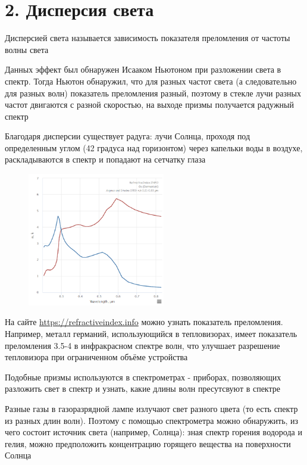 \section{2. Дисперсия света}

Дисперсией света называется зависимость показателя преломления от частоты волны света

Данных эффект был обнаружен Исааком Ньютоном при разложении света в спектр. Тогда Ньютон обнаружил, что для разных частот света (а следовательно для разных волн) показатель преломления разный, поэтому в стекле лучи разных частот двигаются с разной скоростью, на выходе призмы получается радужный спектр 

Благодаря дисперсии существует радуга: лучи Солнца, проходя под определенным углом (42 градуса над горизонтом) через капельки воды в воздухе, раскладываются в спектр и попадают на сетчатку глаза

\begin{figure}
    \includegraphics[width=6cm]{physics3/images/physics3_germanium_refractive_index}
\end{figure}

На сайте \url{https://refractiveindex.info} можно узнать показатель преломления. Например, металл германий, использующийся в тепловизорах, имеет показатель преломления 3.5-4 в инфракрасном спектре волн, что улучшает разрешение тепловизора при ограниченном объёме устройства

Подобные призмы используются в спектрометрах - приборах, позволяющих разложить свет в спектр и узнать, какие длины волн пресутсвуют в спектре

Разные газы в газоразрядной лампе излучают свет разного цвета (то есть спектр из разных длин волн). Поэтому с помощью спектрометра можно обнаружить, из чего состоит источник света (например, Солнца): зная спектр горения водорода и гелия, можно предположить концентрацию горящего вещества на поверхности Солнца

